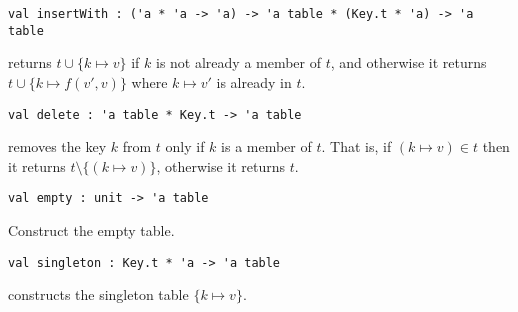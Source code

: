 \begin{cluster}
\label{grp:grm:ordtable-interface::insertwith}

\begin{gram}[insertWith]
\label{grm:ordtable-interface::insertwith}
\begin{verbatim}
val insertWith : ('a * 'a -> 'a) -> 'a table * (Key.t * 'a) -> 'a table
\end{verbatim}
 returns $t \cup \{k \mapsto v\}$ if $k$ is not
already a member of $t$, and otherwise it returns $t \cup \{k \mapsto f(v',v)\}$
where $k \mapsto v'$ is already in $t$.

\end{gram}
\end{cluster}

\begin{cluster}
\label{grp:grm:ordtable-interface::delete}

\begin{gram}[delete]
\label{grm:ordtable-interface::delete}
\begin{verbatim}
val delete : 'a table * Key.t -> 'a table
\end{verbatim}
 removes the key $k$ from $t$ only if $k$ is a member of $t$.
That is, if $(k \mapsto v) \in t$ then it returns
$t \setminus \{(k \mapsto v)\}$, otherwise it returns $t$.

\end{gram}
\end{cluster}

\begin{cluster}
\label{grp:grm:ordtable-interface::empty}

\begin{gram}[empty]
\label{grm:ordtable-interface::empty}
\begin{verbatim}
val empty : unit -> 'a table
\end{verbatim}
Construct the empty table.

\end{gram}
\end{cluster}

\begin{cluster}
\label{grp:gr:ordtable-interface:singleton}

\begin{gram}[singleton]
\label{gr:ordtable-interface:singleton}
\begin{verbatim}
val singleton : Key.t * 'a -> 'a table
\end{verbatim}
 constructs the singleton table $\{k \mapsto v\}$.

\end{gram}
\end{cluster}

